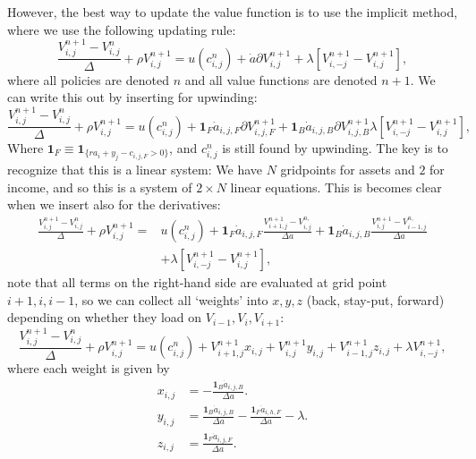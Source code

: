 \documentclass[12pt]{article}
\DeclareMathOperator{\1}{\mathbbm{1}}
\begin{document}
However, the best way to update the value function is to use the implicit method, where we use the following updating rule:
\begin{equation}
\frac{V^{n+1}_{i,j} - V^n_{i,j}}\Delta + \rho V^{n+1}_{i,j} =u(c^n_{i,j}) + \dot a \partial V^{n+1}_{i,j} + \lambda [V^{n+1}_{i,-j} - V^{n+1}_{i,j}],
\end{equation}
where all policies are denoted $n$ and all value functions are denoted $n+1$. We can write this out by inserting for upwinding:
\begin{equation}
\frac{V^{n+1}_{i,j} - V^n_{i,j}}{\Delta} +  \rho V^{n+1}_{i,j} =u(c^n_{i,j}) + \mathbf{1}_F\dot a_{i,j,F} \partial V^{n+1}_{i,j,F} + \mathbf{1}_B \dot a_{i,j,B} \partial V^{n+1}_{i,j,B} \lambda [V^{n+1}_{i,-j} - V^{n+1}_{i,j}],
\end{equation}
Where $\mathbf{1}_F \equiv \mathbf{1}_{\{ra_i + y_j - c_{i,j,F}>0\}}$, and  $c^n_{i,j}$ is still found by upwinding. The key is to recognize that this is a linear system: We have $N$ gridpoints for assets and $2$ for income, and so this is a system of $2\times N$ linear equations. This is becomes clear when we insert also for the derivatives:
\begin{equation}
\begin{split}
\frac{V^{n+1}_{i,j} - V^n_{i,j}}{\Delta} +  \rho V^{n+1}_{i,j} =&u(c^n_{i,j}) + \mathbf{1}_F\dot a_{i,j,F} \frac{V^{n+1}_{i+1,j} - V^{n,}_{i,j}}{\Delta a } + \mathbf{1}_B \dot a_{i,j,B} \frac{V^{n+1}_{i,j} - V^{n,}_{i-1,j}}{\Delta a}  \\
 & + \lambda [V^{n+1}_{i,-j} - V^{n+1}_{i,j}],
\end{split}
\end{equation}
note that all terms on the right-hand side are evaluated at grid point $i+1,i,i-1$, so we can collect all `weights' into $x,y,z$ (back, stay-put, forward)  depending on whether they load on $V_{i-1},V_i,V_{i+1}$:
\begin{equation}\label{eq:systemeq}
\frac{V^{n+1}_{i,j} - V^n_{i,j}}{\Delta} +  \rho V^{n+1}_{i,j} =u(c^n_{i,j}) + V^{n+1}_{i+1,j}x_{i,j} + V^{n+1}_{i,j}y_{i,j} + V^{n+1}_{i-1,j}z_{i,j}
 + \lambda V^{n+1}_{i,-j},
\end{equation}
where each weight is given by
\begin{align*}
x_{i,j} &=  -\frac{\mathbf{1}_B \dot a_{i,j,B}}{\Delta a}. \\
y_{i,j} &=  \frac{\mathbf{1}_B \dot a_{i,j,B}}{\Delta a} -\frac{\mathbf{1}_F \dot a_{i,h,F}}{\Delta a} - \lambda. \\
z_{i,j} &= \frac{\mathbf{1}_F \dot a_{i,j,F}}{\Delta a}.
\end{align*}
\end{document}
